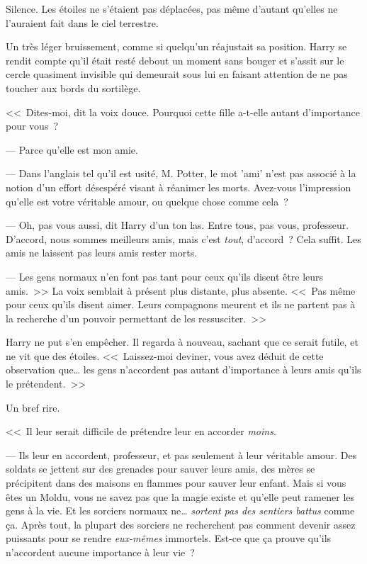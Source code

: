Silence. Les étoiles ne s'étaient pas déplacées, pas même d'autant qu'elles ne l'auraient fait dans le ciel terrestre.

Un très léger bruissement, comme si quelqu'un réajustait sa position. Harry se rendit compte qu'il était resté debout un moment sans bouger et s'assit sur le cercle quasiment invisible qui demeurait sous lui en faisant attention de ne pas toucher aux bords du sortilège.

<<~Dites-moi, dit la voix douce. Pourquoi cette fille a-t-elle autant d'importance pour vous~?

--- Parce qu'elle est mon amie.

--- Dans l'anglais tel qu'il est usité, M. Potter, le mot 'ami' n'est pas associé à la notion d'un effort désespéré visant à réanimer les morts. Avez-vous l'impression qu'elle est votre véritable amour, ou quelque chose comme cela~?

--- Oh, pas vous aussi, dit Harry d'un ton las. Entre tous, pas vous, professeur. D'accord, nous sommes meilleurs amis, mais c'est \emph{tout}, d'accord~? Cela suffit. Les amis ne laissent pas leurs amis rester morts.

--- Les gens normaux n'en font pas tant pour ceux qu'ils disent être leurs amis.~>> La voix semblait à présent plus distante, plus absente. <<~Pas même pour ceux qu'ils disent aimer. Leurs compagnons meurent et ils ne partent pas à la recherche d'un pouvoir permettant de les ressusciter.~>>

Harry ne put s'en empêcher. Il regarda à nouveau, sachant que ce serait futile, et ne vit que des étoiles. <<~Laissez-moi deviner, vous avez déduit de cette observation que… les gens n'accordent pas autant d'importance à leurs amis qu'ils le prétendent.~>>

Un bref rire.

<<~Il leur serait difficile de prétendre leur en accorder \emph{moins}.

--- Ils leur en accordent, professeur, et pas seulement à leur véritable amour. Des soldats se jettent sur des grenades pour sauver leurs amis, des mères se précipitent dans des maisons en flammes pour sauver leur enfant. Mais si vous êtes un Moldu, vous ne savez pas que la magie existe et qu'elle peut ramener les gens à la vie. Et les sorciers normaux ne… \emph{sortent pas des sentiers battus} comme ça. Après tout, la plupart des sorciers ne recherchent pas comment devenir assez puissants pour se rendre \emph{eux-mêmes} immortels. Est-ce que ça prouve qu'ils n'accordent aucune importance à leur vie~?

